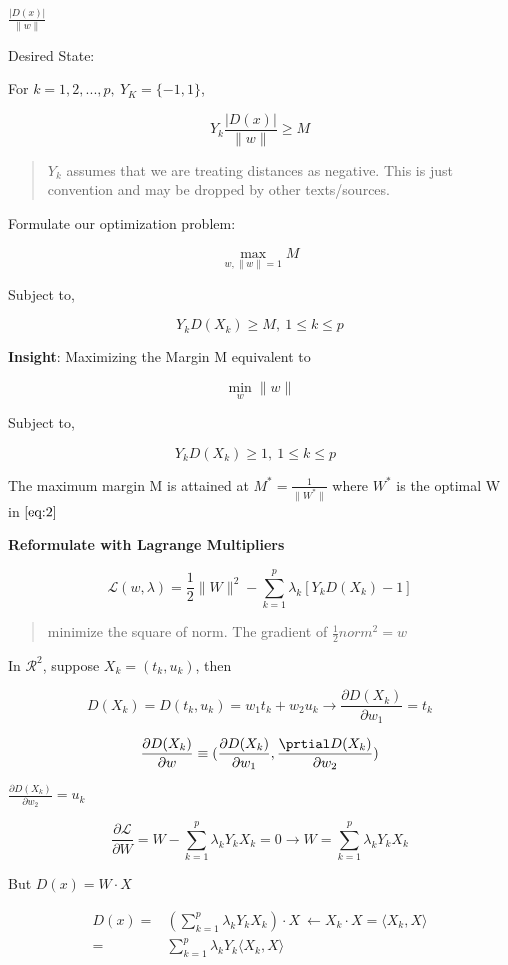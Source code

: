\documentclass[11pt]{article}
\begin{document}
\(\frac{|D(x)|}{\|w\|}\)

Desired State:

For \(k = 1,2,...,p, \ Y_K = \{-1, 1\}\),

$$
Y_k \frac{|D(x)|}{\|w\|} \geq M
$$

\begin{quote}
\(Y_k\) assumes that we are treating distances as negative. This is just
convention and may be dropped by other texts/sources.
\end{quote}

Formulate our optimization problem:

$$
\max_{w, \|w\| = 1} M
$$

Subject to,

$$
Y_k D(X_k) \geq M, \ 1 \leq k \leq p
$$

\textbf{Insight}: Maximizing the Margin M equivalent to

$$
\min_{w} \|w\|
$$

Subject to,

$$
Y_k D(X_k) \geq 1, \ 1 \leq k \leq p \ \ \ \label{eq:2}
$$

The maximum margin M is attained at \(M^* = \frac{1}{\|W^*\|}\) where \(W^*\) is the
optimal W in \(\eqref{eq:2}\)


\textbf{Reformulate with Lagrange Multipliers}

$$
\mathcal L (w, \lambda) = \frac{1}{2} \|W\|^2 - \sum_{k = 1}^{p} \lambda_k [Y_k
D(X_k) - 1]
$$

\begin{quote}
minimize the square of norm. The gradient of \(\frac{1}{2} norm^2 = w\)
\end{quote}

In \(\mathcal R^2\), suppose \(X_k = (t_k, u_k)\), then

$$
D(X_k) = D(t_k, u_k) = w_1 t_k + w_2 u_k \to \frac{\partial D(X_k)}{\partial
w_1} = t_k
$$


$$
\frac{\partial D(X_k)}{\partial w} \equiv (\frac{\partial D(X_k)}{\partial w_1},
\frac{\prtial D(X_k)}{\partial w_2})
$$

\(\frac{\partial D(X_k)}{\partial w_2} = u_k\)


$$
\frac{\partial \mathcal{L}}{\partial W} = W - \sum_{k = 1}^{p} \lambda_k Y_k X_k
= 0 \to W = \sum_{k = 1}^{p} \lambda_k Y_k X_k
$$

But \(D(x) = W \cdot X\)

\begin{equation}
\begin{split}
D(x) = & (\sum_{k = 1}^{p} \lambda_k Y_k X_k) \cdot X \ \leftarrow X_k \cdot X = \langle X_k, X \rangle\\
= & \sum_{k = 1}^{p} \lambda_k Y_k \langle X_k, X \rangle
\end{split}
\end{equation}
\end{document}

